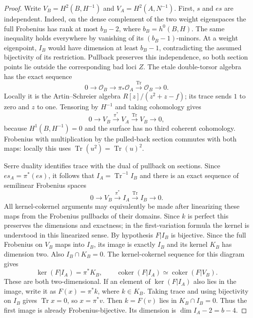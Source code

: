 \begin{proof}
Write $V_B=H^2(B,H^{-1})$ and $V_A=H^2(A,N^{-1})$.
First, $s$ and $es$ are independent. Indeed, on the dense
complement of the two weight eigenspaces the full Frobenius has
rank at most $b_B-2$, where $b_B=h^0(B,H)$.
The same inequality holds everywhere by vanishing of its
$(b_B-1)$-minors. At a weight eigenpoint, $I_B$ would have
dimension at least $b_B-1$, contradicting the assumed bijectivity
of its restriction. Pullback preserves this independence, so
both section points lie outside the corresponding bad loci $Z$.
The etale double-torsor algebra has the exact sequence
\[
 0\longrightarrow\mathcal O_B
   \longrightarrow\pi_*\mathcal O_A
   \xrightarrow{\operatorname{Tr}}\mathcal O_B
   \longrightarrow0.
\]
Locally it is the Artin--Schreier algebra
$R[z]/(z^2+z-f)$; its trace sends $1$ to zero and $z$ to one.
Tensoring by $H^{-1}$ and taking cohomology gives
\[
 0\longrightarrow V_B\xrightarrow{\pi^*}V_A
   \xrightarrow{\operatorname{Tr}}V_B\longrightarrow0,
\]
because $H^1(B,H^{-1})=0$ and the surface has no third coherent
cohomology. Frobenius with multiplication by the pulled-back
section commutes with both maps: locally this uses
$\operatorname{Tr}(u^2)=\operatorname{Tr}(u)^2$.

Serre duality identifies trace with the dual of pullback on
sections. Since $es_A=\pi^*(es)$, it follows that
$I_A=\operatorname{Tr}^{-1}I_B$ and there is an exact sequence
of semilinear Frobenius spaces
\[
 0\longrightarrow V_B\xrightarrow{\pi^*}I_A
   \xrightarrow{\operatorname{Tr}}I_B\longrightarrow0.
\]
All kernel-cokernel arguments may equivalently be made after
linearizing these maps from the Frobenius pullbacks of their
domains. Since $k$ is perfect this preserves the dimensions and
exactness; in the first-variation formula the kernel is understood
in this linearized sense.
By hypothesis $F|I_B$ is bijective. Since the full Frobenius on
$V_B$ maps into $I_B$, its image is exactly $I_B$ and its kernel
$K_B$ has dimension two. Also $I_B\cap K_B=0$.
The kernel-cokernel sequence for this diagram gives
\[
 \ker(F|I_A)=\pi^*K_B,\qquad
 \operatorname{coker}(F|I_A)
       \simeq\operatorname{coker}(F|V_B).
\]
These are both two-dimensional.
If an element of $\ker(F|I_A)$ also lies in the image, write it
as $F(x)=\pi^*k$, where $k\in K_B$.
Taking trace and using bijectivity on $I_B$ gives
$\operatorname{Tr}x=0$, so $x=\pi^*v$.
Then $k=F(v)$ lies in $K_B\cap I_B=0$.
Thus the first image is already Frobenius-bijective.
Its dimension is $\dim I_A-2=b-4$.


\end{proof}

